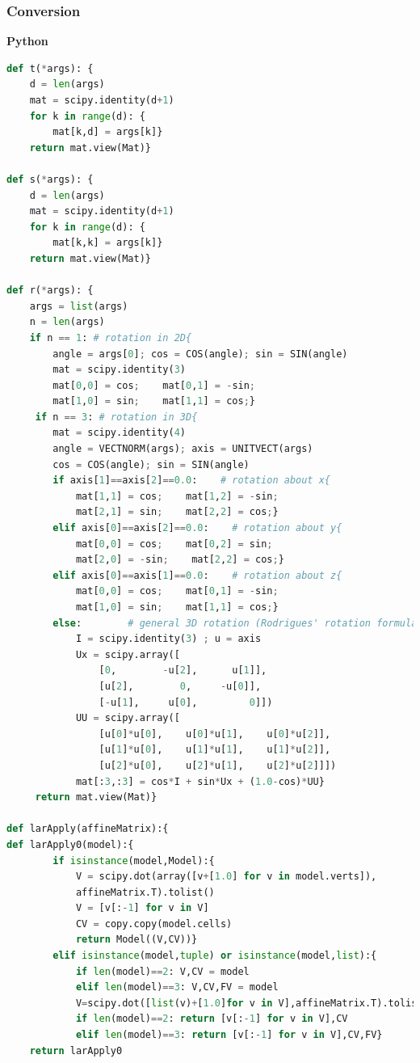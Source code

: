 \documentclass[a4paper,12pt]{article}
\begin{document}
\subsubsection{Conversion}
\textbf{Python}
\begin{lstlisting}[language=Python,format=Julia]
def t(*args): {
    d = len(args)
    mat = scipy.identity(d+1)
    for k in range(d): {
        mat[k,d] = args[k]}
    return mat.view(Mat)}

def s(*args): {
    d = len(args)
    mat = scipy.identity(d+1)
    for k in range(d): {
        mat[k,k] = args[k]}
    return mat.view(Mat)}

def r(*args): {
    args = list(args)
    n = len(args)
    if n == 1: # rotation in 2D{
        angle = args[0]; cos = COS(angle); sin = SIN(angle)
        mat = scipy.identity(3)
        mat[0,0] = cos;    mat[0,1] = -sin;
        mat[1,0] = sin;    mat[1,1] = cos;}
     if n == 3: # rotation in 3D{
        mat = scipy.identity(4)
        angle = VECTNORM(args); axis = UNITVECT(args)
        cos = COS(angle); sin = SIN(angle)
        if axis[1]==axis[2]==0.0:    # rotation about x{
            mat[1,1] = cos;    mat[1,2] = -sin;
            mat[2,1] = sin;    mat[2,2] = cos;}
        elif axis[0]==axis[2]==0.0:    # rotation about y{
            mat[0,0] = cos;    mat[0,2] = sin;
            mat[2,0] = -sin;    mat[2,2] = cos;}
        elif axis[0]==axis[1]==0.0:    # rotation about z{
            mat[0,0] = cos;    mat[0,1] = -sin;
            mat[1,0] = sin;    mat[1,1] = cos;}
        else:        # general 3D rotation (Rodrigues' rotation formula)    {
            I = scipy.identity(3) ; u = axis
            Ux = scipy.array([
                [0,        -u[2],      u[1]],
                [u[2],        0,     -u[0]],
                [-u[1],     u[0],         0]])
            UU = scipy.array([
                [u[0]*u[0],    u[0]*u[1],    u[0]*u[2]],
                [u[1]*u[0],    u[1]*u[1],    u[1]*u[2]],
                [u[2]*u[0],    u[2]*u[1],    u[2]*u[2]]])
            mat[:3,:3] = cos*I + sin*Ux + (1.0-cos)*UU}
     return mat.view(Mat)}

def larApply(affineMatrix):{
def larApply0(model):{
        if isinstance(model,Model):{
            V = scipy.dot(array([v+[1.0] for v in model.verts]), 
            affineMatrix.T).tolist()
            V = [v[:-1] for v in V]
            CV = copy.copy(model.cells)
            return Model((V,CV))}
        elif isinstance(model,tuple) or isinstance(model,list):{
            if len(model)==2: V,CV = model
            elif len(model)==3: V,CV,FV = model
            V=scipy.dot([list(v)+[1.0]for v in V],affineMatrix.T).tolist()
            if len(model)==2: return [v[:-1] for v in V],CV
            elif len(model)==3: return [v[:-1] for v in V],CV,FV}
    return larApply0
\end{lstlisting}
\end{document}
